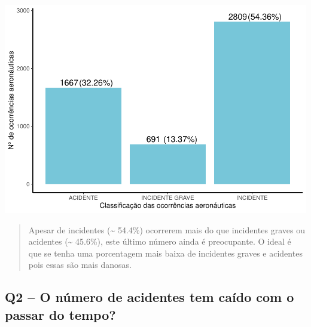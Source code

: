 \documentclass[
]{article}
\begin{document}
\begin{center}\includegraphics[width=1\linewidth]{../4.Relatorio/pdf/index_files/figure-latex/unnamed-chunk-20-1} \end{center}

\begin{quote}
Apesar de incidentes (\textasciitilde{} 54.4\%) ocorrerem mais do que
incidentes graves ou acidentes (\textasciitilde{} 45.6\%), este último
número ainda é preocupante. O ideal é que se tenha uma porcentagem mais
baixa de incidentes graves e acidentes pois essas são mais danosas.
\end{quote}

\hypertarget{q2-o-nuxfamero-de-acidentes-tem-cauxeddo-com-o-passar-do-tempo}{%
\subsection{Q2 -- O número de acidentes tem caído com o passar do
tempo?}\label{q2-o-nuxfamero-de-acidentes-tem-cauxeddo-com-o-passar-do-tempo}}
\end{document}

